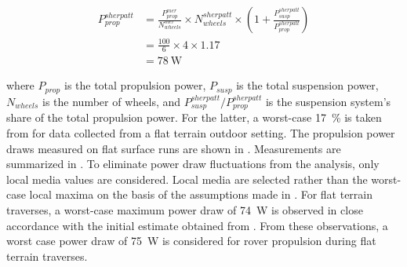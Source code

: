 \begin{align}
  \label{eq:InitialPropulsionPowerEstimate}
  P_{prop}^{sherpatt} &= \frac{P_{prop}^{mer}}{N_{wheels}^{mer}} \times N_{wheels}^{sherpatt} \times \left(1 +\frac{P_{susp}^{sherpatt}}{P_{prop}^{sherpatt}}\right) \\
           &= \frac{100}{6} \times 4 \times 1.17\\
           &= \SI{78}{\watt}
\end{align}


where $P_{prop}$ is the total propulsion power, $P_{susp}$ is the total suspension power, $N_{wheels}$ is the number of wheels, and $P_{susp}^{sherpatt} / P_{prop}^{sherpatt}$ is the suspension system's share of the total propulsion power. For the latter, a worst-case \SI{17}{\percent} is taken from  for data collected from a flat terrain outdoor setting. The propulsion power draws measured on flat surface runs are shown in . Measurements are summarized in . To eliminate power draw fluctuations from the analysis, only local media values are considered. Local media are selected rather than the worst-case local maxima on the basis of the assumptions made in . For flat terrain traverses, a worst-case maximum power draw of \SI{74}{\watt} is observed in close accordance with the initial estimate obtained from . From these observations, a worst case power draw of \SI{75}{\watt} is considered for rover propulsion during flat terrain traverses.




